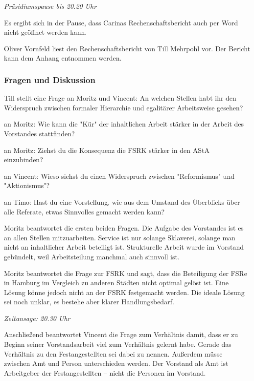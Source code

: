 \documentclass[ngerman,headheight=70pt]{scrartcl}
\begin{document}
    \textit{Präsidiumspause bis 20.20 Uhr}

    Es ergibt sich in der Pause, dass Carinas Rechenschaftsbericht
    auch per Word nicht geöffnet werden kann.

    Oliver Vornfeld liest den Rechenschaftsbericht von Till Mehrpohl vor.
    Der Bericht kann dem Anhang entnommen werden.

    \subsubsection{Fragen und Diskussion}

    Till stellt eine Frage an Moritz und Vincent: An welchen Stellen habt
    ihr den Widerspruch zwischen formaler Hierarchie und egalitärer
    Arbeitsweise gesehen?

    an Moritz: Wie kann die "Kür" der inhaltlichen Arbeit stärker in der
    Arbeit des Vorstandes stattfinden?

    an Moritz: Ziehst du die Konsequenz die FSRK stärker in den AStA einzubinden?

    an Vincent: Wieso siehst du einen Widerspruch zwischen "Reformismus"
    und "Aktionismus"?

    an Timo: Hast du eine Vorstellung, wie aus dem Umstand des Überblicks
    über alle Referate, etwas Sinnvolles gemacht werden kann?

    Moritz beantwortet die ersten beiden Fragen. Die Aufgabe des Vorstandes
    ist es an allen Stellen mitzuarbeiten. Service ist nur solange Sklaverei,
    solange man nicht an inhaltlicher Arbeit beteiligt ist. Strukturelle
    Arbeit wurde im Vorstand gebündelt, weil Arbeitsteilung manchmal auch
    sinnvoll ist.

    Moritz beantwortet die Frage zur FSRK und sagt, dass die Beteiligung der FSRe
    in Hamburg im Vergleich zu anderen Städten nicht optimal gelöst ist. Eine
    Lösung könne jedoch nicht an der FSRK festgemacht werden. Die ideale Lösung
    sei noch unklar, es bestehe aber klarer Handlungsbedarf.

    \textit{Zeitansage: 20.30 Uhr}

    Anschließend beantwortet Vincent die Frage zum Verhältnis damit, dass er
    zu Beginn seiner Vorstandsarbeit viel zum Verhältnis gelernt habe.
    Gerade das Verhältnis zu den Festangestellten sei dabei zu nennen.
    Außerdem müsse zwischen Amt und Person unterschieden werden. Der Vorstand als
    Amt ist Arbeitgeber der Festangestellten -- nicht die Personen im Vorstand.
\end{document}
